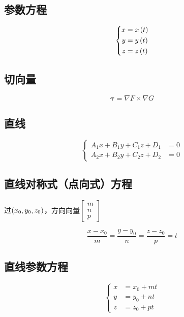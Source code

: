 \documentclass{article}
\begin{document}
\subsection{参数方程}

\[\left\{\begin{aligned}
        x & =x\left(t\right) \\
        y & =y\left(t\right) \\
        z & =z\left(t\right)
    \end{aligned}\right.\]

\subsection{切向量}

\[\boldsymbol\tau=\nabla F\times\nabla G\]

\subsection{直线}

\begin{definition}[]
    \[\left\{\begin{aligned}
            A_1x+B_1y+C_1z+D_1 & =0 \\
            A_2x+B_2y+C_2z+D_2 & =0
        \end{aligned}\right.\]
\end{definition}

\subsection{直线对称式（点向式）方程}

过$\left(x_0,y_0,z_0\right)$，方向向量$\begin{bmatrix}m\\n\\p\end{bmatrix}$

\[\frac{x-x_0}m=\frac{y-y_0}n=\frac{z-z_0}p=t\]

\subsection{直线参数方程}

\[\left\{\begin{aligned}
        x & =x_0+mt \\
        y & =y_0+nt \\
        z & =z_0+pt
    \end{aligned}\right.\]
\end{document}
